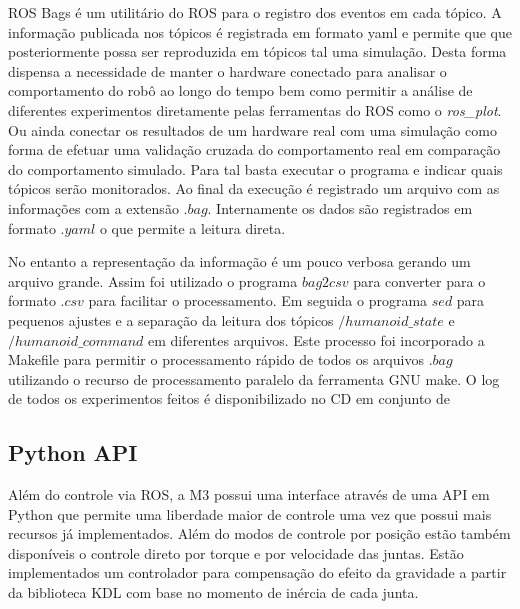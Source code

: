 ROS Bags é um utilitário do ROS para o registro dos eventos em cada tópico. A informação publicada nos tópicos é registrada em formato yaml e permite que que posteriormente possa ser reproduzida em tópicos tal uma simulação. Desta forma dispensa a necessidade de manter o hardware conectado para analisar o comportamento do robô ao longo do tempo bem como permitir a análise de diferentes experimentos diretamente pelas ferramentas do ROS como o \textit{ros\_plot}. Ou ainda conectar os resultados de um hardware real com uma simulação como forma de efetuar uma validação cruzada do comportamento real em comparação do comportamento simulado. Para tal basta executar o programa e indicar quais tópicos serão monitorados. Ao final da execução é registrado um arquivo com as informações com a extensão $.bag$. Internamente os dados são registrados em formato $.yaml$ o que permite a leitura direta.

No entanto a representação da informação é um pouco verbosa gerando um arquivo grande. Assim foi utilizado o programa $bag2csv$ para converter para o formato $.csv$ para facilitar o processamento. Em seguida o programa $sed$ para pequenos ajustes e a separação da leitura dos tópicos  $/humanoid\_state$ e $/humanoid\_command$ em diferentes arquivos. Este processo foi incorporado a Makefile para permitir o processamento rápido de todos os arquivos $.bag$ utilizando o recurso de processamento paralelo da ferramenta GNU make. O log de todos os experimentos feitos é disponibilizado no CD em conjunto de

\subsection{Python API}

Além do controle via ROS, a M3 possui uma interface através de uma API em Python que permite uma liberdade maior de controle uma vez que possui mais recursos já implementados. Além do modos de controle por posição estão também disponíveis o controle direto por torque e por velocidade das juntas. Estão implementados um controlador para compensação do efeito da gravidade a partir da biblioteca KDL com base no momento de inércia de cada junta.

